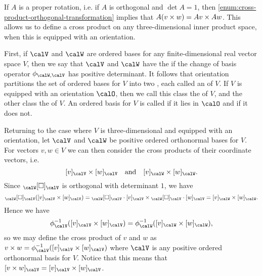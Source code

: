 If $A$ is a proper rotation, i.e. if $A$ is orthogonal and $\det A = 1$, then \cref{enum:cross-product-orthogonal-transformation} implies that $A(v \times w) = Av \times Aw$. This allows us to define a cross product on any three-dimensional inner product space, when this is equipped with an orientation.

First, if $\calV$ and $\calW$ are ordered bases for any finite-dimensional real vector space $V$, then we say that $\calV$ and $\calW$ have the  if the change of basis operator $\basischange{\calW}{\calV}$ has positive determinant. It follows that orientation partitions the set of ordered bases for $V$ into two , each called an  of $V$. If $V$ is equipped with an orientation $\calO$, then we call this class the  of $V$, and the other class the  of $V$. An ordered basis for $V$ is called  if it lies in $\calO$ and  if it does not.

Returning to the case where $V$ is three-dimensional and equipped with an orientation, let $\calV$ and $\calW$ be positive ordered orthonormal bases for $V$. For vectors $v,w \in V$ we can then consider the cross products of their coordinate vectors, i.e.
%
\begin{equation*}
    \coordvec{v}{\calV} \crossp \coordvec{w}{\calV}
    \quad \text{and} \quad
    \coordvec{v}{\calW} \crossp \coordvec{w}{\calW}.
\end{equation*}
%
Since $\basischangemat{\calW}{\calV}$ is orthogonal with determinant $1$, we have
%
\begin{equation*}
    \basischangemat{\calW}{\calV}(\coordvec{v}{\calV} \crossp \coordvec{w}{\calV})
        = \basischangemat{\calW}{\calV} \cdot \coordvec{v}{\calV} \crossp \basischangemat{\calW}{\calV} \cdot \coordvec{w}{\calV}
        = \coordvec{v}{\calW} \crossp \coordvec{w}{\calW}.
\end{equation*}
%
Hence we have
%
\begin{equation*}
    \inv{\coordmap{\calV}}(\coordvec{v}{\calV} \crossp \coordvec{w}{\calV})
        = \inv{\coordmap{\calW}}(\coordvec{v}{\calW} \crossp \coordvec{w}{\calW}),
\end{equation*}
%
so we may define the cross product of $v$ and $w$ as $v \crossp w = \inv{\coordmap{\calV}}(\coordvec{v}{\calV} \crossp \coordvec{w}{\calV})$ where $\calV$ is any positive ordered orthonormal basis for $V$. Notice that this means that $\coordvec{v \crossp w}{\calV} = \coordvec{v}{\calV} \crossp \coordvec{w}{\calV}$.

